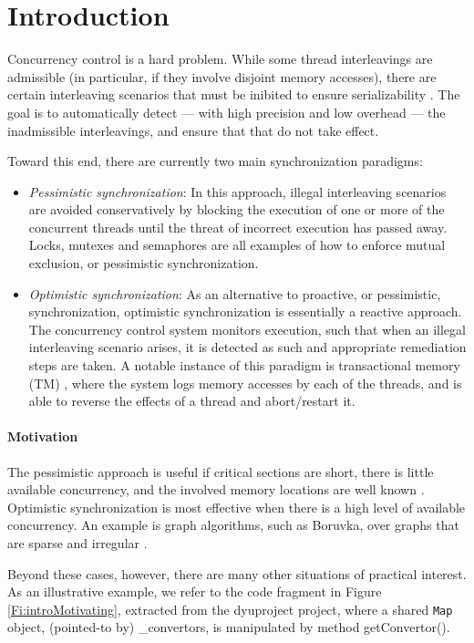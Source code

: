 \section{Introduction}

Concurrency control is a hard problem. While some thread interleavings are admissible (in particular, if they involve disjoint memory accesses), there are certain interleaving scenarios that must be inibited to ensure serializability \cite{XXX}. The goal is to automatically detect --- with high precision and low overhead --- the inadmissible interleavings, and ensure that that do not take effect.  

Toward this end, there are currently two main synchronization paradigms:
\begin{itemize}
	\item \textit{Pessimistic synchronization}: In this approach, illegal interleaving scenarios are avoided conservatively by blocking the execution of one or more of the concurrent threads until the threat of incorrect execution has passed away. Locks, mutexes and semaphores are all examples of how to enforce mutual exclusion, or pessimistic synchronization.
	\item \textit{Optimistic synchronization}: As an alternative to proactive, or pessimistic, synchronization, optimistic synchronization is essentially a reactive approach. The concurrency control system monitors execution, such that when an illegal interleaving scenario arises, it is detected as such and appropriate remediation steps are taken. A notable instance of this paradigm is transactional memory (TM) \cite{XXX}, where the system logs memory accesses by each of the threads, and is able to reverse the effects of a thread and abort/restart it.
\end{itemize}

\paragraph{Motivation} The pessimistic approach is useful if critical sections are short, there is little available concurrency, and the involved memory locations are well known \cite{XXX}. Optimistic synchronization is most effective when there is a high level of available concurrency. An example is graph algorithms, such as Boruvka, over graphs that are sparse and irregular \cite{XXX}.

Beyond these cases, however, there are many other situations of practical interest. As an illustrative example, we refer to the code fragment in Figure \ref{Fi:introMotivating}, extracted from the {\sf dyuproject} project, where a shared {\tt Map} object, (pointed-to by) {\sf \_convertors}, is manipulated by method {\sf getConvertor()}.

